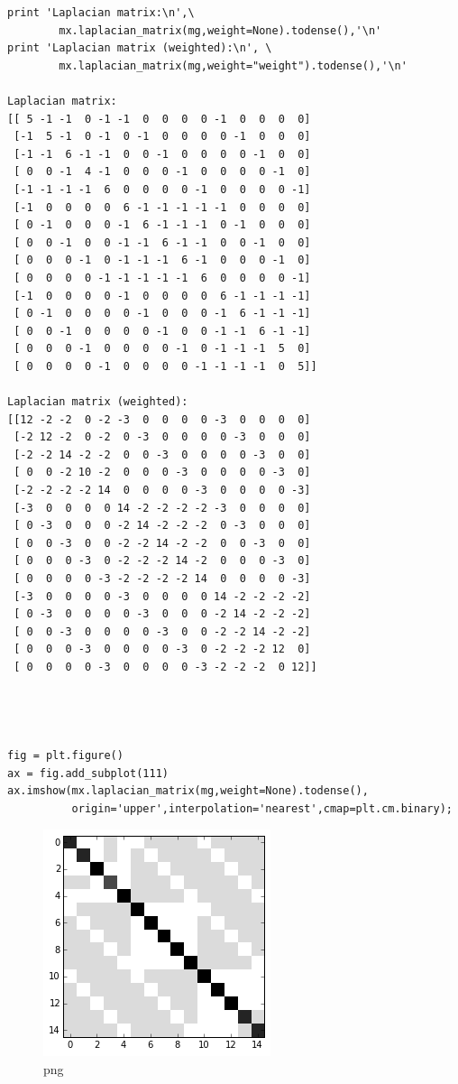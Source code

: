 \documentclass[]{article}
\begin{document}
\begin{verbatim}
print 'Laplacian matrix:\n',\
        mx.laplacian_matrix(mg,weight=None).todense(),'\n'
print 'Laplacian matrix (weighted):\n', \
        mx.laplacian_matrix(mg,weight="weight").todense(),'\n'

Laplacian matrix:
[[ 5 -1 -1  0 -1 -1  0  0  0  0 -1  0  0  0  0]
 [-1  5 -1  0 -1  0 -1  0  0  0  0 -1  0  0  0]
 [-1 -1  6 -1 -1  0  0 -1  0  0  0  0 -1  0  0]
 [ 0  0 -1  4 -1  0  0  0 -1  0  0  0  0 -1  0]
 [-1 -1 -1 -1  6  0  0  0  0 -1  0  0  0  0 -1]
 [-1  0  0  0  0  6 -1 -1 -1 -1 -1  0  0  0  0]
 [ 0 -1  0  0  0 -1  6 -1 -1 -1  0 -1  0  0  0]
 [ 0  0 -1  0  0 -1 -1  6 -1 -1  0  0 -1  0  0]
 [ 0  0  0 -1  0 -1 -1 -1  6 -1  0  0  0 -1  0]
 [ 0  0  0  0 -1 -1 -1 -1 -1  6  0  0  0  0 -1]
 [-1  0  0  0  0 -1  0  0  0  0  6 -1 -1 -1 -1]
 [ 0 -1  0  0  0  0 -1  0  0  0 -1  6 -1 -1 -1]
 [ 0  0 -1  0  0  0  0 -1  0  0 -1 -1  6 -1 -1]
 [ 0  0  0 -1  0  0  0  0 -1  0 -1 -1 -1  5  0]
 [ 0  0  0  0 -1  0  0  0  0 -1 -1 -1 -1  0  5]] 

Laplacian matrix (weighted):
[[12 -2 -2  0 -2 -3  0  0  0  0 -3  0  0  0  0]
 [-2 12 -2  0 -2  0 -3  0  0  0  0 -3  0  0  0]
 [-2 -2 14 -2 -2  0  0 -3  0  0  0  0 -3  0  0]
 [ 0  0 -2 10 -2  0  0  0 -3  0  0  0  0 -3  0]
 [-2 -2 -2 -2 14  0  0  0  0 -3  0  0  0  0 -3]
 [-3  0  0  0  0 14 -2 -2 -2 -2 -3  0  0  0  0]
 [ 0 -3  0  0  0 -2 14 -2 -2 -2  0 -3  0  0  0]
 [ 0  0 -3  0  0 -2 -2 14 -2 -2  0  0 -3  0  0]
 [ 0  0  0 -3  0 -2 -2 -2 14 -2  0  0  0 -3  0]
 [ 0  0  0  0 -3 -2 -2 -2 -2 14  0  0  0  0 -3]
 [-3  0  0  0  0 -3  0  0  0  0 14 -2 -2 -2 -2]
 [ 0 -3  0  0  0  0 -3  0  0  0 -2 14 -2 -2 -2]
 [ 0  0 -3  0  0  0  0 -3  0  0 -2 -2 14 -2 -2]
 [ 0  0  0 -3  0  0  0  0 -3  0 -2 -2 -2 12  0]
 [ 0  0  0  0 -3  0  0  0  0 -3 -2 -2 -2  0 12]] 




fig = plt.figure()
ax = fig.add_subplot(111)
ax.imshow(mx.laplacian_matrix(mg,weight=None).todense(),
          origin='upper',interpolation='nearest',cmap=plt.cm.binary);
\end{verbatim}

\begin{figure}[htbp]
\centering
\includegraphics{output_37_0.png}
\caption{png}
\end{figure}
\end{document}

